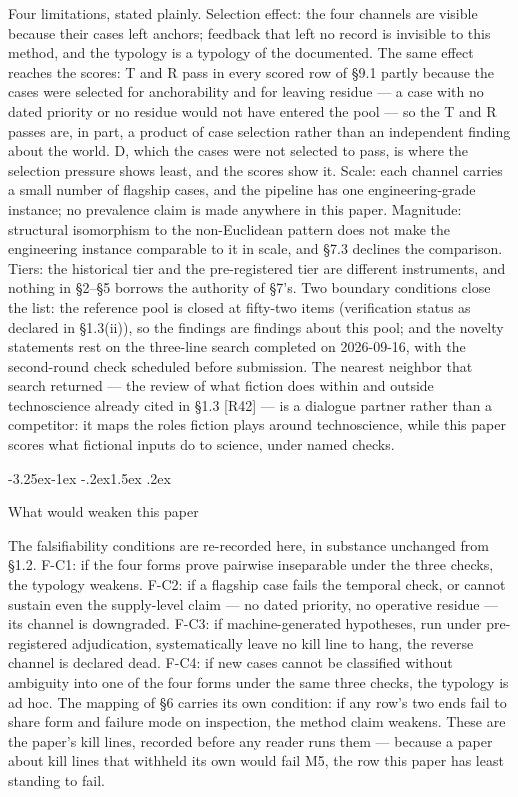 \documentclass[11pt,a4paper]{article}
\makeatletter
\renewcommand\subsection{\@startsection{subsection}{2}{\z@}%
  {-3.25ex\@plus -1ex \@minus -.2ex}{1.5ex \@plus .2ex}%
  {\normalfont\large\bfseries\raggedright}}
\makeatother
\begin{document}
Four limitations, stated plainly. Selection effect: the four channels are visible because their cases left anchors; feedback that left no record is invisible to this method, and the typology is a typology of the documented. The same effect reaches the scores: T and R pass in every scored row of §9.1 partly because the cases were selected for anchorability and for leaving residue — a case with no dated priority or no residue would not have entered the pool — so the T and R passes are, in part, a product of case selection rather than an independent finding about the world. D, which the cases were not selected to pass, is where the selection pressure shows least, and the scores show it. Scale: each channel carries a small number of flagship cases, and the pipeline has one engineering-grade instance; no prevalence claim is made anywhere in this paper. Magnitude: structural isomorphism to the non-Euclidean pattern does not make the engineering instance comparable to it in scale, and §7.3 declines the comparison. Tiers: the historical tier and the pre-registered tier are different instruments, and nothing in §2–§5 borrows the authority of §7's. Two boundary conditions close the list: the reference pool is closed at fifty-two items (verification status as declared in §1.3(ii)), so the findings are findings about this pool; and the novelty statements rest on the three-line search completed on 2026-09-16, with the second-round check scheduled before submission. The nearest neighbor that search returned — the review of what fiction does within and outside technoscience already cited in §1.3 [R42] — is a dialogue partner rather than a competitor: it maps the roles fiction plays around technoscience, while this paper scores what fictional inputs do to science, under named checks.

\subsection{What would weaken this paper}

The falsifiability conditions are re-recorded here, in substance unchanged from §1.2. F-C1: if the four forms prove pairwise inseparable under the three checks, the typology weakens. F-C2: if a flagship case fails the temporal check, or cannot sustain even the supply-level claim — no dated priority, no operative residue — its channel is downgraded. F-C3: if machine-generated hypotheses, run under pre-registered adjudication, systematically leave no kill line to hang, the reverse channel is declared dead. F-C4: if new cases cannot be classified without ambiguity into one of the four forms under the same three checks, the typology is ad hoc. The mapping of §6 carries its own condition: if any row's two ends fail to share form and failure mode on inspection, the method claim weakens. These are the paper's kill lines, recorded before any reader runs them — because a paper about kill lines that withheld its own would fail M5, the row this paper has least standing to fail.
\end{document}
